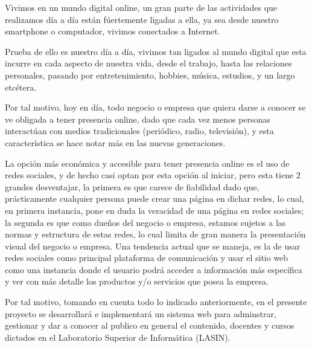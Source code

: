 Vivimos en un mundo digital online, un gran parte de las actividades que realizamos día a día
están fúertemente ligadas a ella, ya sea desde nuestro smartphone o computador, vivimos
conectados a Internet.

Prueba de ello es nuestro día a día, vivimos tan ligados al mundo digital que
esta incurre en cada aspecto de nuestra vida, desde el trabajo, hasta las relaciones
personales, pasando por entretenimiento, hobbies, música, estudios, y un largo etcétera.

Por tal motivo, hoy en día, todo negocio o empresa que quiera darse a conocer se ve 
obligada a tener presencia online, dado que cada vez menos personas interactúan
con medios tradicionales (periódico, radio, televisión), y esta característica se 
hace notar más en las nuevas generaciones.

La opción más económica y accesible para tener presencia online es el uso de redes
sociales, y de hecho casi optan por esta opción al iniciar, pero esta tiene 2 grandes
desventajar, la primera es que carece de fiabilidad dado que, prácticamente cualquier
persona puede crear una página en dichar redes, lo cual, en primera instancia, pone
en duda la veracidad de una página en redes sociales; la segunda es que como dueños
del negocio o empresa, estamos sujetos a las normas y estructura de estas
redes, lo cual limita de gran manera la presentación visual del negocio o empresa.
Una tendencia actual que se maneja, es la de usar redes sociales como principal
plataforma de comunicación y usar el sitio web como una instancia donde el
usuario podrá acceder a información más específica y ver con más detalle 
los productos y/o servicios que posea la empresa. 

Por tal motivo, tomando en cuenta todo lo indicado anteriormente, en el presente
proyecto se desarrollará e implementará un sistema web para adminstrar, gestionar
y dar a conocer al publico en general
el contenido, docentes y cursos dictados en el Laboratorio Superior de Informática
(LASIN).